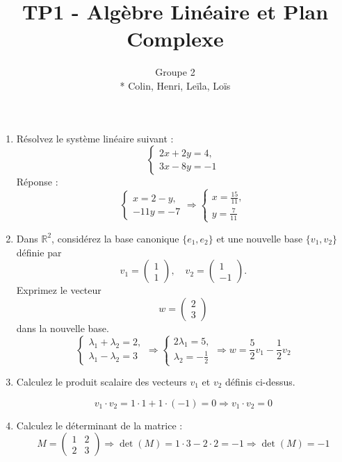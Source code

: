 \documentclass[a4paper,12pt]{article}
\title{TP1 - Algèbre Linéaire et Plan Complexe}
\author{Groupe 2 \\* Colin, Henri, Leïla, Loïs}
\begin{document}
\maketitle


\begin{enumerate}
    \item Résolvez le système linéaire suivant :
\[
\begin{cases}
2x + 2y = 4,\\[1mm]
3x - 8y  = -1 
\end{cases}
\]
Réponse :
\[
\begin{cases}
x = 2 - y,\\[1mm]
-11y = -7  
\end{cases}
\Rightarrow
\boxed{
\begin{cases}
x = \frac{15}{11}, \\[1mm]
y = \frac{7}{11}
\end{cases}
}
\]

    \item Dans \(\mathbb{R}^2\), considérez la base canonique \(\{e_1, e_2\}\) et une nouvelle base \(\{v_1, v_2\}\) définie par
\[
v_1 = \begin{pmatrix} 1 \\ 1 \end{pmatrix}, \quad
v_2 = \begin{pmatrix} 1 \\ -1 \end{pmatrix}.
\]
Exprimez le vecteur 
\[
w = \begin{pmatrix} 2 \\ 3 \end{pmatrix}
\]
dans la nouvelle base.
\[
\begin{cases}
\lambda_1 + \lambda_2 = 2,\\[1mm]
\lambda_1 - \lambda_2 = 3 
\end{cases}
\Rightarrow
\begin{cases}
2 \lambda_1 = 5,\\[1mm]
\lambda_2 = -\frac{1}{2} 
\end{cases}
\Rightarrow
\boxed{
w = \frac{5}{2} v_1 - \frac{1}{2} v_2
}
\]

    \item Calculez le produit scalaire des vecteurs $v_1$ et $v_2$ définis ci-dessus.

\[
v_1 \cdot v_2 = 1 \cdot 1 + 1 \cdot (-1) = 0
\Rightarrow \boxed{v_1 \cdot v_2 = 0}
\]

    \item Calculez le déterminant de la matrice :
\[
M = 
\begin{pmatrix} 
1 & 2 \\ 
2 & 3 
\end{pmatrix}
\Rightarrow
\det(M) = 1 \cdot 3 - 2 \cdot 2 = -1
\Rightarrow \boxed{\det(M) = -1}
\]
\end{enumerate}
\end{document}
